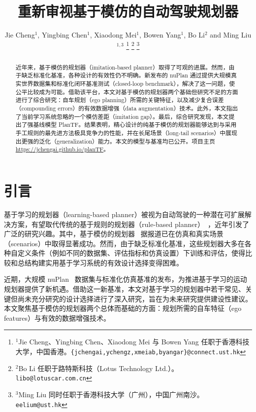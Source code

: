 \documentclass[letterpaper, 10 pt, conference]{ieeeconf}  %
\title{\LARGE \bf
重新审视基于模仿的自动驾驶规划器
}
\author{Jie Cheng$^{1}$, Yingbing Chen$^{1}$, Xiaodong Mei$^{1}$, Bowen Yang$^{1}$, Bo Li${^2}$ and Ming Liu$^{1,3}$%
\thanks{$^{1}$Jie Cheng、Yingbing Chen、Xiaodong Mei 与 Bowen Yang 任职于香港科技大学，中国香港。\texttt{\{jchengai,ychengz,xmeiab,byangar\}@connect.ust.hk}}%
\thanks{$^{2}$Bo Li 任职于路特斯科技（Lotus Technology Ltd.）。\texttt{libo@lotuscar.com.cn}}%
\thanks{$^{3}$Ming Liu 同时任职于香港科技大学（广州），中国广州南沙。\texttt{eelium@ust.hk}} %
}
\begin{document}
\maketitle
\thispagestyle{empty}
\pagestyle{empty}


\begin{abstract}

近年来，基于模仿的规划器（imitation-based planner）取得了可观的进展。然而，由于缺乏标准化基准，各种设计的有效性仍不明确。新发布的 nuPlan 通过提供大规模真实世界数据集和标准化闭环基准测试（closed-loop benchmark），解决了这一问题，使公平比较成为可能。借助该平台，本文对基于模仿的规划器两个基础但研究不足的方面进行了综合研究：自车规划（ego planning）所需的关键特征，以及减少复合误差（compounding errors）的有效数据增强（data augmentation）技术。此外，本文指出了当前学习系统忽略的一个模仿差距（imitation gap）。最后，综合研究发现，本文提出了强基线模型 PlanTF。结果表明，精心设计的纯基于模仿的规划器能够达到与采用手工规则的最先进方法极具竞争力的性能，并在长尾场景（long-tail scenarios）中展现出更强的泛化（generalization）能力。本文的模型与基准均已公开。项目主页 \url{https://jchengai.github.io/planTF}。

\end{abstract}

\section{引言}

基于学习的规划器（learning-based planner）被视为自动驾驶的一种潜在可扩展解决方案，有望取代传统的基于规则的规划器（rule-based planner）~\cite{chen2023e2e, hagedorn2023rethinking,cheng2022gpir}，近年引发了广泛的研究兴趣。其中，基于模仿的规划器~\cite{bansal2018chauffeurnet, zhou2021exploring, vitelli2022safetynet, scheel2022urban, cheng2022mpnp, pini2023safepathnet, huang2023gameformer, huang2023dipp, guo2023ccil} 据报道已在仿真和真实场景（scenarios）中取得显著成功。然而，由于缺乏标准化基准，这些规划器大多在各种自定义条件（例如不同的数据集、评估指标和仿真设置）下训练和评估，使得比较和总结构建实用基于学习系统的有效设计选择变得困难。

近期，大规模 nuPlan~\cite{caesar2021nuplan} 数据集与标准化仿真基准的发布，为推进基于学习的运动规划器提供了新机遇。借助这一新基准，本文对基于学习的规划器中若干常见、关键但尚未充分研究的设计选择进行了深入研究，旨在为未来研究提供建设性建议。本文聚焦基于模仿的规划器两个总体而基础的方面：规划所需的自车特征（ego features）与有效的数据增强技术。
\end{document}
